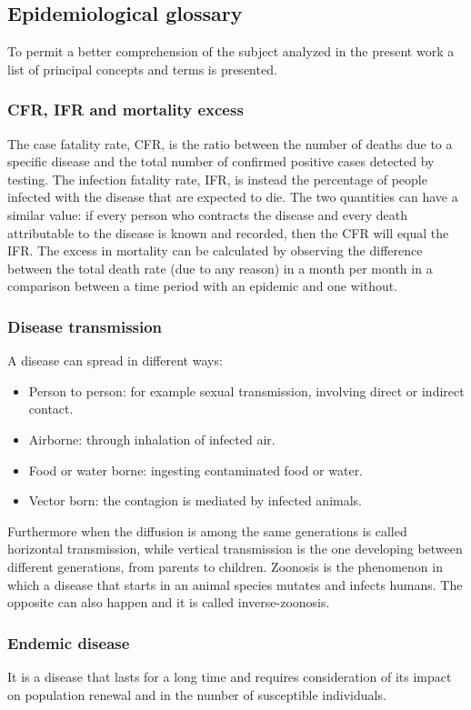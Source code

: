 \subsection{Epidemiological glossary}
\label{subsec:glossary}
To permit a better comprehension of the subject analyzed in the present work a list of principal concepts and terms is presented. 

\subsubsection{CFR, IFR and mortality excess} The case fatality rate, CFR, is the ratio between the number of deaths due to a specific disease and the total number of confirmed positive cases detected by testing. 
The infection fatality rate, IFR, is instead the percentage of people infected with the disease that are expected to die. The two quantities can have a similar value: if every person who contracts the disease and every death attributable to the disease is known and recorded, then the CFR will equal the IFR.
The excess in mortality can be calculated by observing the difference between the total death rate (due to any reason) in a month per month in a comparison between a time period with an epidemic and one without. 


\subsubsection{Disease transmission} A disease can spread in different ways: 
	\begin{itemize}
		\item Person to person: for example sexual transmission, involving direct or indirect contact.
		\item Airborne: through inhalation of infected air.
		\item Food or water borne: ingesting contaminated food or water. 
		\item Vector born: the contagion is mediated by infected animals.
	\end{itemize}
	Furthermore when the diffusion is among the same generations is called horizontal transmission, while vertical transmission is the one developing between different generations, from parents to children. 
	Zoonosis is the phenomenon in which a disease that starts in an animal species mutates and infects humans. The opposite can also happen and it is called inverse-zoonosis. 

\subsubsection{Endemic disease} It is a disease that lasts for a long time and requires consideration of its impact on population renewal and in the number of susceptible individuals.
	
